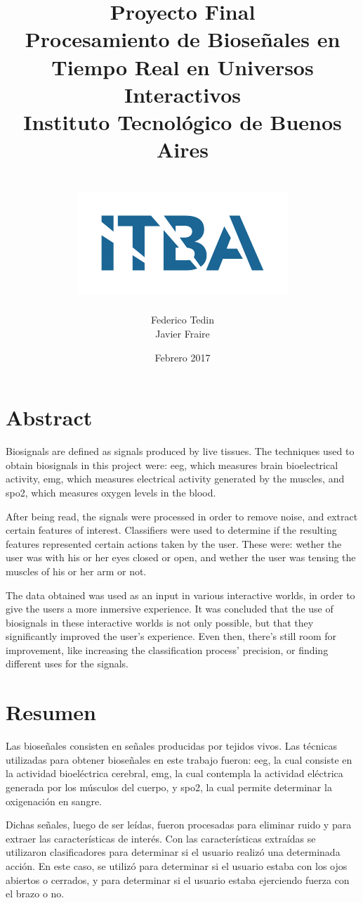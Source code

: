 \documentclass[a4paper]{report}
\title{
	{\LARGE Proyecto Final}\\
	{\Huge Procesamiento de Bioseñales en Tiempo Real en Universos Interactivos}\\
	{\large Instituto Tecnológico de Buenos Aires}\\~\\
	{\includegraphics{itba.png}}
}
\author{{Federico Tedin} \\ {Javier Fraire}}
\date{Febrero 2017}
\begin{document}
\maketitle

\chapter*{Abstract}
\justifying
Biosignals are defined as signals produced by live tissues. The techniques used to obtain biosignals in this project were: \acrshort{eeg}, which measures brain bioelectrical activity, \acrshort{emg}, which measures electrical activity generated by the muscles, and \acrshort{spo2}, which measures oxygen levels in the blood.

After being read, the signals were processed in order to remove noise, and extract certain features of interest. Classifiers were used to determine if the resulting features represented certain actions taken by the user. These were: wether the user was with his or her eyes closed or open, and wether the user was tensing the muscles of his or her arm or not.

The data obtained was used as an input in various interactive worlds, in order to give the users a more inmersive experience. It was concluded that the use of biosignals in these interactive worlds is not only possible, but that they significantly improved the user's experience. Even then, there's still room for improvement, like increasing the classification process' precision, or finding different uses for the signals.

\chapter*{Resumen}
Las bioseñales consisten en señales producidas por tejidos vivos. Las técnicas utilizadas para obtener bioseñales en este trabajo fueron: \gls{eeg}, la cual consiste en la actividad bioeléctrica cerebral, \gls{emg}, la cual contempla la actividad eléctrica generada por los músculos del cuerpo, y \gls{spo2}, la cual permite determinar la oxigenación en sangre.

Dichas señales, luego de ser leídas, fueron procesadas para eliminar ruido y para extraer las características de interés. Con las características extraídas se utilizaron clasificadores para determinar si el usuario realizó una determinada acción. En este caso, se utilizó para determinar si el usuario estaba con los ojos abiertos o cerrados, y para determinar si el usuario estaba ejerciendo fuerza con el brazo o no.
\end{document}
